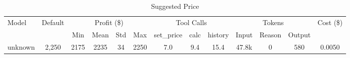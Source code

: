 \begin{table}[h]
\centering
\small
\caption{Suggested Price}
\begin{tabular}{|l|c|c|c|c|c|c|c|c|c|c|c|c|}
\hline
\multirow{2}{*}{Model} & \multirow{2}{*}{Default} & \multicolumn{4}{c|}{Profit (\$)} & \multicolumn{3}{c|}{Tool Calls} & \multicolumn{3}{c|}{Tokens} & \multirow{2}{*}{Cost (\$)} \\
\cline{3-12}
& & Min & Mean & Std & Max & set\_price & calc & history & Input & Reason & Output & \\
\hline
unknown & 2,250 & 2175 & 2235 & 34 & 2250 & 7.0 & 9.4 & 15.4 & 47.8k & 0 & 580 & 0.0050 \\
\hline
\end{tabular}
\end{table}